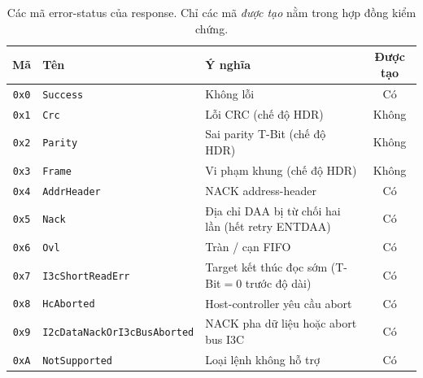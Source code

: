 \begin{table}[!htb]\centering
  \caption{Các mã error-status của response. Chỉ các mã \emph{được tạo} nằm trong hợp đồng
  kiểm chứng.}
  \label{tab:err-codes}
  \small
  \begin{tabular}{@{}c l >{\raggedright\arraybackslash}p{} c@{}}
    \toprule
    \textbf{Mã} & \textbf{Tên} & \textbf{Ý nghĩa} & \textbf{Được tạo} \\
    \midrule
    \texttt{0x0} & \texttt{Success}                    & Không lỗi                                       & Có \\
    \texttt{0x1} & \texttt{Crc}                        & Lỗi CRC (chế độ HDR)                            & Không \\
    \texttt{0x2} & \texttt{Parity}                     & Sai parity T-Bit (chế độ HDR)                   & Không \\
    \texttt{0x3} & \texttt{Frame}                      & Vi phạm khung (chế độ HDR)                      & Không \\
    \texttt{0x4} & \texttt{AddrHeader}                 & NACK address-header                             & Có \\
    \texttt{0x5} & \texttt{Nack}                       & Địa chỉ DAA bị từ chối hai lần (hết retry ENTDAA) & Có \\
    \texttt{0x6} & \texttt{Ovl}                        & Tràn / cạn FIFO                                 & Có \\
    \texttt{0x7} & \texttt{I3cShortReadErr}            & Target kết thúc đọc sớm (T-Bit${=}0$ trước độ dài) & Có \\
    \texttt{0x8} & \texttt{HcAborted}                  & Host-controller yêu cầu abort                   & Có \\
    \texttt{0x9} & \texttt{I2cDataNackOrI3cBusAborted} & NACK pha dữ liệu \iic{} hoặc abort bus I3C       & Có \\
    \texttt{0xA} & \texttt{NotSupported}               & Loại lệnh không hỗ trợ                          & Có \\
    \bottomrule
  \end{tabular}
\end{table}
